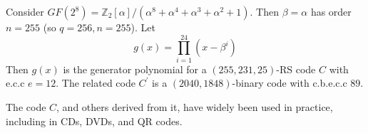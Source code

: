 \begin{Example}{}{}
    Consider $ GF(2^8)=\mathbb{Z}_2[\alpha]/(\alpha^8+\alpha^4+\alpha^3+\alpha^2+1) $.
    Then $ \beta=\alpha $ has order $ n=255 $ (so $ q=256,n=255 $).
    Let
    \[ g(x)=\prod_{i=1}^{24}(x-\beta^i) \]
    Then $ g(x) $ is the generator polynomial for a $ (255,231,25) $-RS
    code $ C $ with e.c.c $ e=12 $. The related code $ C^{\prime} $
    is a $ (2040,1848) $-binary code with c.b.e.c.c $ 89 $.
\end{Example}

The code $ C $, and others derived from it, have widely been used in practice,
including in CDs, DVDs, and QR codes.
